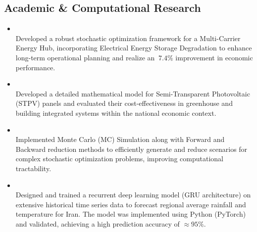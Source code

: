 \documentclass[letter,20pt]{article}
\begin{document}
\subsection*{\fontsize{10pt}{12pt}\selectfont Academic \& Computational Research}
\begin{itemize}[noitemsep, topsep=6pt, after=\vspace{-0.5 mm}, leftmargin = 2ex, rightmargin=1ex]
    
    \small\item[]\\
    Developed a robust stochastic optimization framework for a Multi-Carrier Energy Hub, incorporating Electrical Energy Storage Degradation to enhance long-term operational planning and realize an  $\ 7.4\%$ improvement in economic performance.
    \vspace{0.5em}

    \small\item[]\\
    Developed a detailed mathematical model for Semi-Transparent Photovoltaic (STPV) panels and evaluated their cost-effectiveness in greenhouse and building integrated systems within the national economic context.    \vspace{0.5em}
    
    \small\item[]\\
    Implemented Monte Carlo (MC) Simulation along with Forward and Backward reduction methods to efficiently generate and reduce scenarios for complex stochastic optimization problems, improving computational tractability.    \vspace{0.5em}

    \small\item[]\\
    Designed and trained a recurrent deep learning model (GRU architecture) on extensive historical time series data to forecast regional average rainfall and temperature for Iran. The model was implemented using Python (PyTorch) and validated, achieving a high prediction accuracy of $\approx 95\%$.    
\end{itemize}
\end{document}
